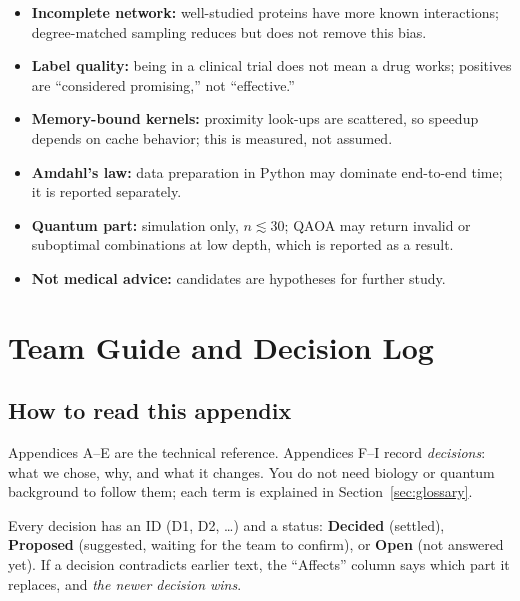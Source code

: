 \begin{itemize}[nosep]
  \item \textbf{Incomplete network:} well-studied proteins have more known
        interactions; degree-matched sampling reduces but does not remove
        this bias.
  \item \textbf{Label quality:} being in a clinical trial does not mean a
        drug works; positives are ``considered promising,'' not ``effective.''
  \item \textbf{Memory-bound kernels:} proximity look-ups are scattered, so
        speedup depends on cache behavior; this is measured, not assumed.
  \item \textbf{Amdahl's law:} data preparation in Python may dominate
        end-to-end time; it is reported separately.
  \item \textbf{Quantum part:} simulation only, $n\lesssim30$; QAOA may
        return invalid or suboptimal combinations at low depth, which is
        reported as a result.
  \item \textbf{Not medical advice:} candidates are hypotheses for further
        study.
\end{itemize}

\section{Team Guide and Decision Log}
\label{app:team}

\subsection{How to read this appendix}

Appendices A--E are the technical reference. Appendices F--I record
\emph{decisions}: what we chose, why, and what it changes. You do not need
biology or quantum background to follow them; each term is explained in
Section~\ref{sec:glossary}.

Every decision has an ID (D1, D2, \dots) and a status:
\textbf{Decided} (settled), \textbf{Proposed} (suggested, waiting for the team
to confirm), or \textbf{Open} (not answered yet). If a decision contradicts
earlier text, the ``Affects'' column says which part it replaces, and
\emph{the newer decision wins}.


